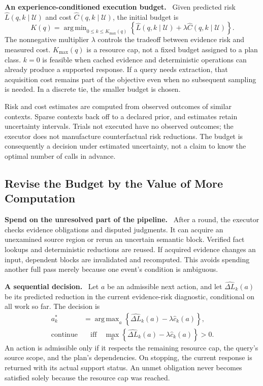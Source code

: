 \documentclass[10pt,twocolumn]{article}
\newcommand{\Uu}{\mathcal{U}}
\newcommand{\runin}[1]{\smallskip\noindent\textbf{#1.}\ }
\DeclareMathOperator*{\argmin}{arg\,min}
\DeclareMathOperator*{\argmax}{arg\,max}
\begin{document}
\runin{An experience-conditioned execution budget}
Given predicted risk $\widehat L(q,k\mid\Uu)$ and cost
$\widehat C(q,k\mid\Uu)$, the initial budget is
\begin{equation}
\label{eq:new-adaptive-budget}
K(q)=\argmin_{0\leq k\leq K_{\max}(q)}
\left\{\widehat L(q,k\mid\Uu)
        +\lambda\widehat C(q,k\mid\Uu)\right\}.
\end{equation}
The nonnegative multiplier $\lambda$ controls the tradeoff between
evidence risk and measured cost. $K_{\max}(q)$ is a resource cap, not a
fixed budget assigned to a plan class. $k=0$ is feasible when cached
evidence and deterministic operations can already produce a supported
response. If a query needs extraction, that acquisition cost remains
part of the objective even when no subsequent sampling is needed.
In a discrete tie, the smaller budget is chosen.

Risk and cost estimates are computed from observed outcomes of
similar contexts. Sparse contexts back off to a declared prior, and
estimates retain uncertainty intervals. Trials not executed have no
observed outcomes; the executor does not manufacture counterfactual
risk reductions. The budget is consequently a decision under estimated
uncertainty, not a claim to know the optimal number of calls in advance.

\subsection{Revise the Budget by the Value of More Computation}
\label{subsec:new-value}

\runin{Spend on the unresolved part of the pipeline}
After a round, the executor checks evidence obligations and disputed
judgments. It can acquire an unexamined source region or rerun an
uncertain semantic block. Verified fact lookups and deterministic
reductions are reused. If acquired evidence changes an input, dependent
blocks are invalidated and recomputed. This avoids spending another
full pass merely because one event's condition is ambiguous.

\runin{A sequential decision}
Let $a$ be an admissible next action, and let
$\widehat{\Delta L}_k(a)$ be its predicted reduction in the current
evidence-risk diagnostic, conditional on all work so far. The decision is
\begin{equation}
\label{eq:new-value}
\begin{split}
a_k^{*}&=\argmax_a
     \left\{\widehat{\Delta L}_k(a)-\lambda\widehat c_k(a)\right\},\\
\mathrm{continue}&\quad\text{iff}\quad
\max_a\left\{\widehat{\Delta L}_k(a)
                       -\lambda\widehat c_k(a)\right\}>0.
\end{split}
\end{equation}
An action is admissible only if it respects the remaining resource cap,
the query's source scope, and the plan's dependencies. On stopping,
the current response is returned with its actual support status. An
unmet obligation never becomes satisfied solely because the resource
cap was reached.
\end{document}

